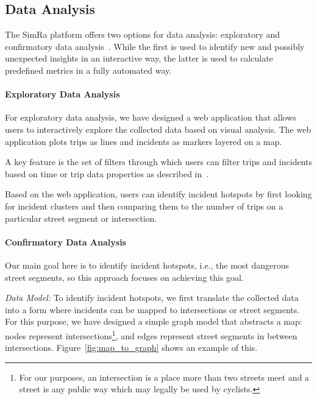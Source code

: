\subsection{Data Analysis}
\label{subsec:data_analysis}
The SimRa platform offers two options for data analysis: exploratory and confirmatory data analysis~\cite{bermbach2017cloud}.
While the first is used to identify new and possibly unexpected insights in an interactive way, the latter is used to calculate predefined metrics in a fully automated way.

\paragraph{Exploratory Data Analysis} \label{subsec:exploratory}
For exploratory data analysis, we have designed a web application that allows users to interactively explore the collected data based on visual analysis.
The web application plots trips as lines and incidents as markers layered on a map.

A key feature is the set of filters through which users can filter trips and incidents based on time or trip data properties as described in~.

Based on the web application, users can identify incident hotspots by first looking for incident clusters and then comparing them to the number of trips on a particular street segment or intersection.


\paragraph{Confirmatory Data Analysis}
Our main goal here is to identify incident hotspots, i.e., the most dangerous street segments, so this approach focuses on achieving this goal.

\textit{Data Model:} To identify incident hotspots, we first translate the collected data into a form where incidents can be mapped to intersections or street segments.
For this purpose, we have designed a simple graph model that abstracts a map: nodes represent intersections\footnote{For our purposes, an intersection is a place more than two streets meet and a street is any public way which may legally be used by cyclists.}, and edges represent street segments in between intersections.
Figure~\ref{fig:map_to_graph} shows an example of this.

